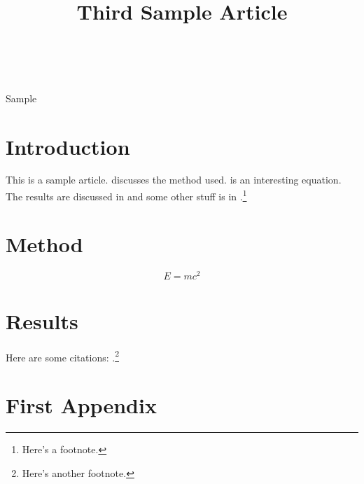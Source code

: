 \documentclass[wcp]{jmlr}
\title[Article 3]{Third Sample Article}
\author{\Name{John Smith}\Email{js@sample.com}\\
\addr{University of No Where}}
\begin{document}
\maketitle

\begin{abstract}
\lipsum[1]
\end{abstract}
\begin{keywords}
Sample
\end{keywords}

\section{Introduction}

This is a sample article.  discusses
the method used.  is an interesting 
equation. The results are discussed in 
and some other stuff is in .\footnote{Here's
a footnote.}

\lipsum

\section{Method}\label{sec:method}

\lipsum

\begin{equation}\label{eq:emc2}
E = mc^2
\end{equation}

\section{Results}\label{sec:results}

\lipsum

Here are some citations:
\citet{guyon-elisseeff-03,guyon2007causalreport}.\footnote{Here's
another footnote.}



\appendix
\section{First Appendix}\label{apd:first}

\lipsum
\end{document}
